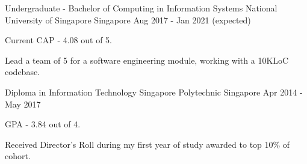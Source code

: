 

\begin{cventries}

  \cventry
    {Undergraduate - Bachelor of Computing in Information Systems} %
    {National University of Singapore} %
    {Singapore} %
    {Aug 2017 - Jan 2021 (expected)} %
    {
      \begin{cvitems} %
        \item {Current CAP - 4.08 out of 5.}
        \item {Lead a team of 5 for a software engineering module, working with a 10KLoC codebase.}
      \end{cvitems}
    }

  \cventry
    {Diploma in Information Technology} %
    {Singapore Polytechnic} %
    {Singapore} %
    {Apr 2014 - May 2017} %
    {
      \begin{cvitems} %
        \item {GPA - 3.84 out of 4.}
        \item {Received Director's Roll during my first year of study awarded to top 10\% of cohort.}
      \end{cvitems}
    }

\end{cventries}
